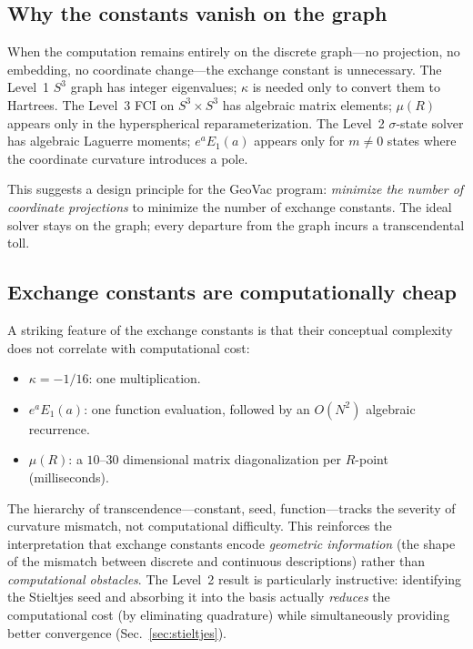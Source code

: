 \documentclass[aps,pra,twocolumn,superscriptaddress,longbibliography]{revtex4-2}
\begin{document}
\subsection{Why the constants vanish on the graph}

When the computation remains entirely on the discrete graph---no
projection, no embedding, no coordinate change---the exchange
constant is unnecessary.  The Level~1 $S^3$ graph has integer
eigenvalues; $\kappa$ is needed only to convert them to Hartrees.
The Level~3 FCI on $S^3 \times S^3$ has algebraic matrix elements;
$\mu(R)$ appears only in the hyperspherical reparameterization.
The Level~2 $\sigma$-state solver has algebraic Laguerre moments;
$e^a E_1(a)$ appears only for $m \neq 0$ states where the
coordinate curvature introduces a pole.

This suggests a design principle for the GeoVac program:
\textit{minimize the number of coordinate projections} to minimize
the number of exchange constants.  The ideal solver stays on the
graph; every departure from the graph incurs a transcendental
toll.

\subsection{Exchange constants are computationally cheap}

A striking feature of the exchange constants is that their
conceptual complexity does not correlate with computational cost:
\begin{itemize}
  \item $\kappa = -1/16$: one multiplication.
  \item $e^a E_1(a)$: one function evaluation, followed by an
    $O(N^2)$ algebraic recurrence.
  \item $\mu(R)$: a $10$--$30$ dimensional matrix diagonalization
    per $R$-point (milliseconds).
\end{itemize}
The hierarchy of transcendence---constant, seed, function---tracks
the severity of curvature mismatch, not computational difficulty.
This reinforces the interpretation that exchange constants encode
\textit{geometric information} (the shape of the mismatch between
discrete and continuous descriptions) rather than
\textit{computational obstacles}.  The Level~2 result is
particularly instructive: identifying the Stieltjes seed and
absorbing it into the basis actually \textit{reduces} the
computational cost (by eliminating quadrature) while simultaneously
providing better convergence (Sec.~\ref{sec:stieltjes}).
\end{document}
